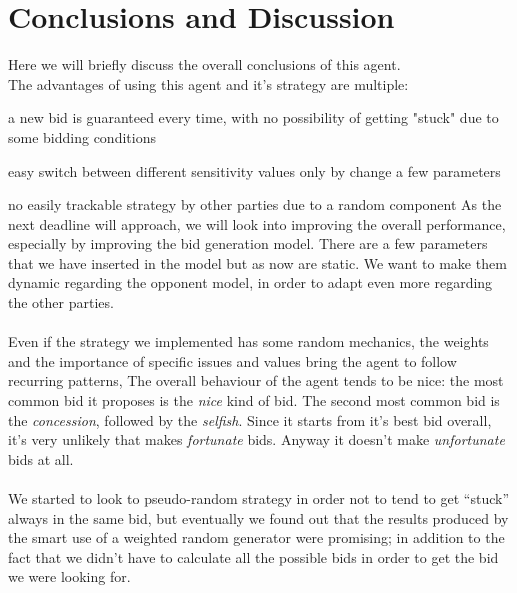 \documentclass[a4,11pt]{scrartcl}
\let\tempone\itemize
\let\temptwo\enditemize
\renewenvironment{itemize}{\tempone\addtolength{\itemsep}{-0.5\baselineskip}}{\temptwo}
\begin{document}
\section{Conclusions and Discussion}\label{conclusion}
Here we will briefly discuss the overall conclusions of this agent.\\
The advantages of using this agent and it's strategy are multiple:
\begin{itemize}
\item a new bid is guaranteed every time, with no possibility of getting "stuck" due to some bidding conditions
\item easy switch between different sensitivity values only by change a few parameters
\item no easily trackable strategy by other parties due to a random component 
\end{itemize}
As the next deadline will approach, we will look into improving the overall performance, especially by improving the bid generation model. There are a few parameters that we have inserted in the model but as now are static. We want to make them dynamic regarding the opponent model, in order to adapt even more regarding the other parties. \\ \\
Even if the strategy we implemented has some random mechanics, the weights and the importance of specific issues and values bring the agent to follow recurring patterns, The overall behaviour of the agent tends to be nice: the most common bid it proposes is the \textit{nice}  kind of bid. The second most common bid is the \textit{concession}, followed by the \textit{selfish}. Since it starts from it’s best bid overall, it’s very unlikely that makes \textit{fortunate} bids. Anyway it doesn’t make \textit{unfortunate} bids at all. \\ \\
We started to look to pseudo-random strategy in order not to tend to get “stuck” always in the same bid, but eventually we found out that the results produced by the smart use of a weighted random generator were promising; in addition to the fact that we didn’t have to calculate all the possible bids in order to get the bid we were looking for.\\ \\ \\
\end{document}

